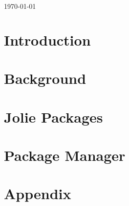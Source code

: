 \documentclass[11pt, a4paper]{report} %
\newcommand{\blankpage}{
  \newpage
  \thispagestyle{empty}
  \mbox{}
  \newpage
}
\begin{document}
\begin{titlepage}
\vfill


{\large \today}%

\end{titlepage}

\tableofcontents

\blankpage

\pagestyle{MyStyle}

\chapter{Introduction}


\chapter{Background}


\chapter{Jolie Packages}


\chapter{Package Manager}


\appendix
\chapter{Appendix}

\end{document}
